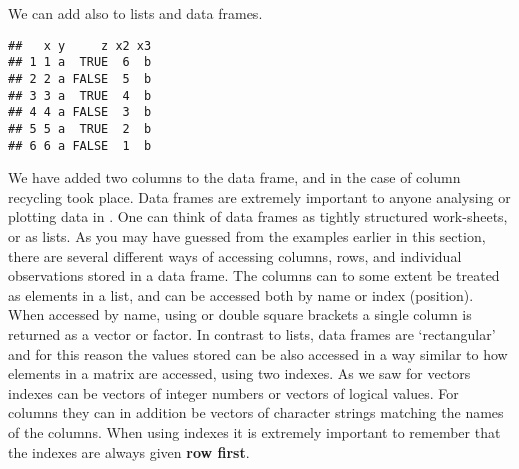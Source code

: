 \documentclass[paper=a4,headsepline,BCOR=12mm,twoside,open=right,%
titlepage,headings=small,fontsize=10pt,index=totoc,bibliography=totoc,%
captions=tableheading,captions=nooneline]{scrbook}\usepackage{knitr}
\begin{document}
We can add also to lists and data frames.

\begin{knitrout}\footnotesize
{}\color{fgcolor}\begin{kframe}
\begin{alltt}
\hlopt{$} \hlkwb{<-} \hlopt{:}
\hlopt{$} \hlkwb{<-} 
\end{alltt}
\begin{verbatim}
##   x y     z x2 x3
## 1 1 a  TRUE  6  b
## 2 2 a FALSE  5  b
## 3 3 a  TRUE  4  b
## 4 4 a FALSE  3  b
## 5 5 a  TRUE  2  b
## 6 6 a FALSE  1  b
\end{verbatim}
\end{kframe}
\end{knitrout}

We have added two columns to the data frame, and in the case of column  recycling took place. Data frames are extremely important to anyone analysing or plotting data in \R. One can think of data frames as tightly structured work-sheets, or as lists. As you may have guessed from the examples earlier in this section, there are several different ways of accessing columns, rows, and individual observations stored in a data frame. The columns can to some extent be treated as elements in a list, and can be accessed both by name or index (position). When accessed by name, using \code{\$} or double square brackets a single column is returned as a vector or factor. In contrast to lists, data frames are `rectangular' and for this reason the values stored can be also accessed in a way similar to how elements in a matrix are accessed, using two indexes. As we saw for vectors indexes can be vectors of integer numbers or vectors of logical values. For columns they can in addition be vectors of character strings matching the names of the columns. When using indexes it is extremely important to remember that the indexes are always given \textbf{row first}.
\end{document}
